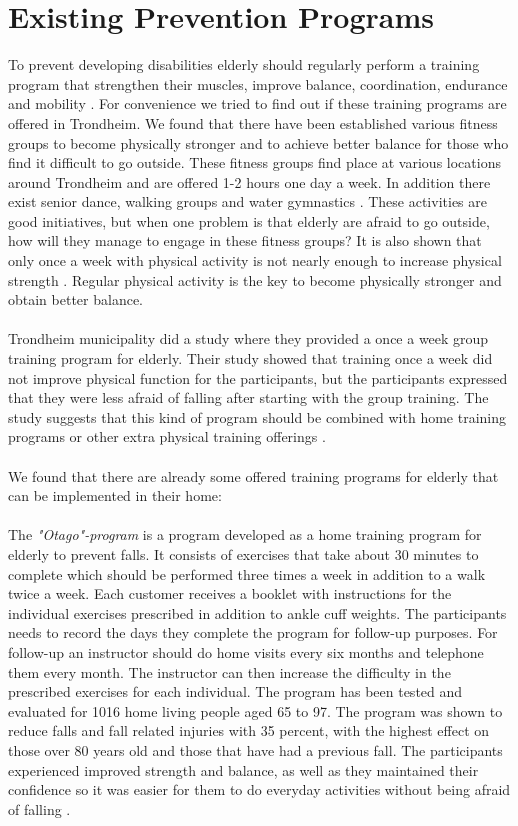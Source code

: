 \section{Existing Prevention Programs}
To prevent developing disabilities elderly should regularly perform a training program that strengthen their muscles, improve balance, coordination, endurance and mobility \cite{gruppetrening-trheim}. For convenience we tried to find out if these training programs are offered in Trondheim. We found that there have been established various fitness groups to become physically stronger and to achieve better balance for those who find it difficult to go outside. These fitness groups find place at various locations around Trondheim and are offered 1-2 hours one day a week. In addition there exist senior dance, walking groups and water gymnastics \cite{trim}. These activities are good initiatives, but when one problem is that elderly are afraid to go outside, how will they manage to engage in these fitness groups? It is also shown that only once a week with physical activity is not nearly enough to increase physical strength \cite{gruppetrening-trheim}. Regular physical activity is the key to become physically stronger and obtain better balance. \\ \\
Trondheim municipality did a study where they provided a once a week group training program for elderly. Their study showed that training once a week did not improve physical function for the participants, but the participants expressed that they were less afraid of falling after starting with the group training. The study suggests that this kind of program should be combined with home training programs or other extra physical training offerings \cite{gruppetrening-trheim}. \\ \\
We found that there are already some offered training programs for elderly that can be implemented in their home:\\ \\
The \emph{"Otago"-program} is a program developed as a home training program for elderly to prevent falls. It consists of exercises that take about 30 minutes to complete which should be performed three times a week in addition to a walk twice a week. Each customer receives a booklet with instructions for the individual exercises prescribed in addition to ankle cuff weights. The participants needs to record the days they complete the program for follow-up purposes. For follow-up an instructor should do home visits every six months and telephone them every month. The instructor can then increase the difficulty in the prescribed exercises for each individual. The program has been tested and evaluated for 1016 home living people aged 65 to 97. The program was shown to reduce falls and fall related injuries with 35 percent, with the highest effect on those over 80 years old and those that have had a previous fall. The participants experienced improved strength and balance, as well as they maintained their confidence so it was easier for them to do everyday activities without being afraid of falling \cite{otago} \cite{gruppetrening-trheim}.\\ \\
